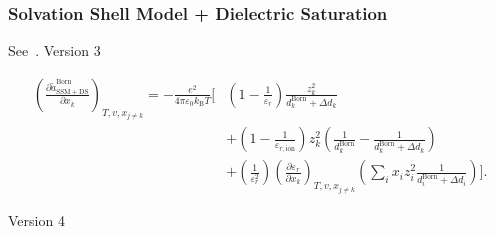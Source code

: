 \documentclass[12pt, letterpaper]{article}
\begin{document}
\subsubsection{Solvation Shell Model + Dielectric Saturation}

See~\cite{Figiel2025}.
Version 3


\begin{equation}
    \begin{aligned}
        \left(\frac{\partial \tilde a_{\mathrm{SSM+DS}}^{\mathrm{Born}}}{\partial x_{k}}\right)_{T,v,x_{j\neq k}}
        =
        -\frac{e^{2}}{4\pi\varepsilon_{0}k_{\mathrm{B}}T}
        \Bigg[
         & \left(1-\frac{1}{\varepsilon_{r}}\right)\frac{z_{k}^{2}}{d_{k}^{\mathrm{Born}}+\Delta d_{k}}
        \\
         & +\left(1-\frac{1}{\varepsilon_{r,\mathrm{ion}}}\right) z_{k}^{2}
            \left(\frac{1}{d_{k}^{\mathrm{Born}}}-\frac{1}{d_{k}^{\mathrm{Born}}+\Delta d_{k}}\right)
        \\
         & +\left(\frac{1}{\varepsilon_{r}^{2}}\right)
            \left(\frac{\partial \varepsilon_{r}}{\partial x_{k}}\right)_{T,v,x_{j\neq k}}
            \left(\sum_{i} x_{i} z_{i}^{2}\frac{1}{d_{i}^{\mathrm{Born}}+\Delta d_{i}}\right)
            \Bigg].
    \end{aligned}
    \label{eq:dares_born_ssmds_dxi_v3}
\end{equation}

Version 4
\end{document}
